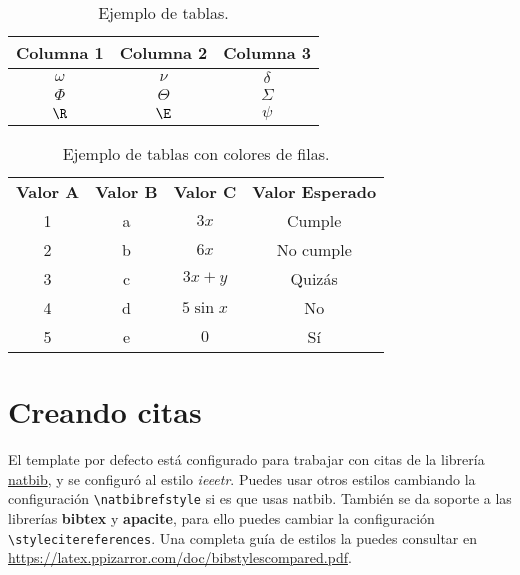 \begin{table}[H] %
	\centering
	\caption{Ejemplo de tablas.}
	\begin{tabular}{ccc}
		\hline
		\textbf{Columna 1} & \textbf{Columna 2} & \textbf{Columna 3} \bigstrut\\
		\hline
		$\omega$ & $\nu$ & $\delta$ \bigstrut[t]\\
		$\Phi$ & $\Theta$ & $\varSigma$ \\
		$\R$ & $\E$ & $\psi$ \\
		\hline
	\end{tabular}
	\label{tab:tabla-1}
\end{table}

\enabletablerowcolor
\begin{table}[H]
	\centering
	\caption{Ejemplo de tablas con colores de filas.}
	\begin{tabular}{ccccc}
		\rowcolor[rgb]{ .749,  .749,  .749} \textbf{Valor A} & \textbf{Valor B} & \textbf{Valor C} & \multicolumn{2}{c}{\textbf{Valor Esperado}} \\
		1     & a     & $3x$  & \multicolumn{2}{c}{Cumple} \\
		2     & b     & $6x$  & \multicolumn{2}{c}{No cumple} \\
		3     & c     & $3x+y$ & \multicolumn{2}{c}{Quizás} \\
		4     & d     & $5\sin x$ & \multicolumn{2}{c}{No} \\
		5     & e     & $0$ & \multicolumn{2}{c}{Sí} \\
	\end{tabular}
\end{table}
\disabletablerowcolor
	
\section{Creando citas}

El template por defecto está configurado para trabajar con citas de la librería \href{https://www.ctan.org/pkg/natbib}{natbib}, y se configuró al estilo \textit{ieeetr}. Puedes usar otros estilos cambiando la configuración \texttt{\textbackslash natbibrefstyle} si es que usas natbib. También se da soporte a las librerías \textbf{bibtex} y \textbf{apacite}, para ello puedes cambiar la configuración \texttt{\textbackslash stylecitereferences}. Una completa guía de estilos la puedes consultar en \url{https://latex.ppizarror.com/doc/bibstylescompared.pdf}. \\

